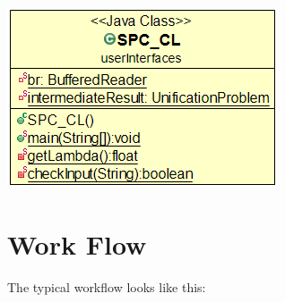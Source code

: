 \documentclass{article}
\begin{document}
\newpage
\includegraphics[scale=0.5]{UIModel}


\section{Work Flow}
The typical workflow looks like this:

%




%



%
\end{document}
